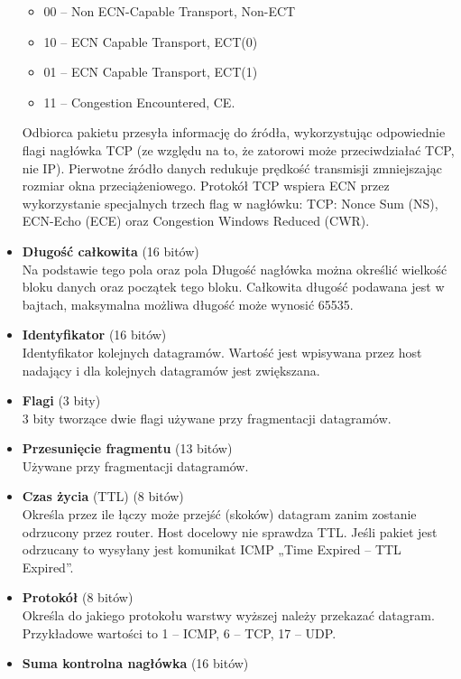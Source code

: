\documentclass[../main.tex]{subfiles}
\begin{document}
\begin{itemize}
        \begin{itemize}
            \item 00 – Non ECN-Capable Transport, Non-ECT
            \item 10 – ECN Capable Transport, ECT(0)
            \item 01 – ECN Capable Transport, ECT(1)
            \item 11 – Congestion Encountered, CE.
        \end{itemize}
        Odbiorca pakietu przesyła informację do źródła, wykorzystując odpowiednie flagi nagłówka TCP (ze względu na to, że zatorowi może przeciwdziałać TCP, nie IP). Pierwotne źródło danych redukuje prędkość transmisji zmniejszając rozmiar okna przeciążeniowego. Protokół TCP wspiera ECN przez wykorzystanie specjalnych trzech flag w nagłówku: TCP: Nonce Sum (NS), ECN-Echo (ECE) oraz Congestion Windows Reduced (CWR).
        \item \textbf{Długość całkowita} (16 bitów)\\
        Na podstawie tego pola oraz pola Długość nagłówka można określić wielkość bloku danych oraz początek tego bloku. Całkowita długość podawana jest w bajtach, maksymalna możliwa długość może wynosić 65535.
        \item \textbf{Identyfikator} (16 bitów)\\
        Identyfikator kolejnych datagramów. Wartość jest wpisywana przez host nadający i dla kolejnych datagramów jest zwiększana.
        \item \textbf{Flagi} (3 bity)\\
        3 bity tworzące dwie flagi używane przy fragmentacji datagramów.
        \item \textbf{Przesunięcie fragmentu} (13 bitów)\\
        Używane przy fragmentacji datagramów.
        \item \textbf{Czas życia} (TTL) (8 bitów)\\
        Określa przez ile łączy może przejść (skoków) datagram zanim zostanie odrzucony przez router. Host docelowy nie sprawdza TTL. Jeśli pakiet jest odrzucany to wysyłany jest komunikat ICMP „Time Expired – TTL Expired”.
        \item \textbf{Protokół} (8 bitów)\\
        Określa do jakiego protokołu warstwy wyższej należy przekazać datagram. Przykładowe wartości to 1 – ICMP, 6 – TCP, 17 – UDP.
        \item \textbf{Suma kontrolna nagłówka} (16 bitów)\\

\end{itemize}
\end{document}
